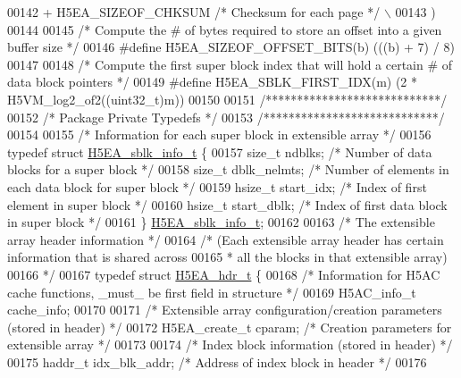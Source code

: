 \begin{DoxyCode}
00142 \textcolor{preprocessor}{    + H5EA\_SIZEOF\_CHKSUM                        }\textcolor{comment}{/* Checksum for each page */}\textcolor{preprocessor}{  \(\backslash\)}
00143 \textcolor{preprocessor}{    )}
00144 
00145 \textcolor{comment}{/* Compute the # of bytes required to store an offset into a given buffer size */}
00146 \textcolor{preprocessor}{#define H5EA\_SIZEOF\_OFFSET\_BITS(b)      (((b) + 7) / 8)}
00147 
00148 \textcolor{comment}{/* Compute the first super block index that will hold a certain # of data block pointers */}
00149 \textcolor{preprocessor}{#define H5EA\_SBLK\_FIRST\_IDX(m)          (2 * H5VM\_log2\_of2((uint32\_t)m))}
00150 
00151 \textcolor{comment}{/****************************/}
00152 \textcolor{comment}{/* Package Private Typedefs */}
00153 \textcolor{comment}{/****************************/}
00154 
00155 \textcolor{comment}{/* Information for each super block in extensible array */}
00156 \textcolor{keyword}{typedef} \textcolor{keyword}{struct }\hyperlink{struct_h5_e_a__sblk__info__t}{H5EA\_sblk\_info\_t} \{
00157     \textcolor{keywordtype}{size\_t} ndblks;              \textcolor{comment}{/* Number of data blocks for a super block */}
00158     \textcolor{keywordtype}{size\_t} dblk\_nelmts;         \textcolor{comment}{/* Number of elements in each data block for super block */}
00159     hsize\_t start\_idx;          \textcolor{comment}{/* Index of first element in super block */}
00160     hsize\_t start\_dblk;         \textcolor{comment}{/* Index of first data block in super block */}
00161 \} \hyperlink{struct_h5_e_a__sblk__info__t}{H5EA\_sblk\_info\_t};
00162 
00163 \textcolor{comment}{/* The extensible array header information */}
00164 \textcolor{comment}{/* (Each extensible array header has certain information that is shared across}
00165 \textcolor{comment}{ * all the blocks in that extensible array)}
00166 \textcolor{comment}{ */}
00167 \textcolor{keyword}{typedef} \textcolor{keyword}{struct }\hyperlink{struct_h5_e_a__hdr__t}{H5EA\_hdr\_t} \{
00168     \textcolor{comment}{/* Information for H5AC cache functions, \_must\_ be first field in structure */}
00169     H5AC\_info\_t cache\_info;
00170 
00171     \textcolor{comment}{/* Extensible array configuration/creation parameters (stored in header) */}
00172     H5EA\_create\_t cparam;               \textcolor{comment}{/* Creation parameters for extensible array */}
00173 
00174     \textcolor{comment}{/* Index block information (stored in header) */}
00175     haddr\_t idx\_blk\_addr;               \textcolor{comment}{/* Address of index block in header */}
00176 

\end{DoxyCode}
